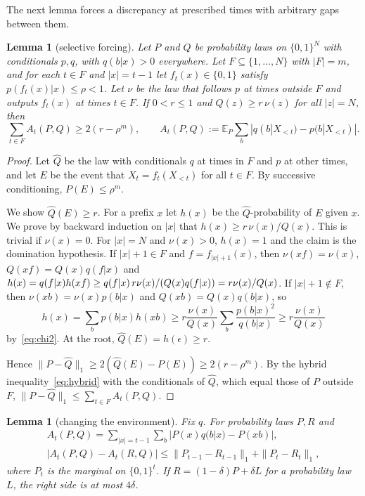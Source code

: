 \documentclass[11pt]{article}
\newcommand{\B}{\{0,1\}}
\newcommand{\eps}{\epsilon}
\newcommand{\E}{\mathbb{E}}
\newtheorem{lemma}[theorem]{Lemma}
\theoremstyle{definition}
\theoremstyle{remark}
\begin{document}
The next lemma forces a discrepancy at prescribed times with arbitrary gaps
between them.

\begin{lemma}[selective forcing]\label{lem:forcing}
Let $P$ and $Q$ be probability laws on $\B^N$ with conditionals $p,q$, with
$q(b|x)>0$ everywhere. Let $F\subseteq\{1,\dots,N\}$ with $|F|=m$, and for
each $t\in F$ and $|x|=t-1$ let $f_t(x)\in\B$ satisfy $p(f_t(x)|x)\le\rho<1$.
Let $\nu$ be the law that follows $p$ at times outside $F$ and outputs $f_t(x)$
at times $t\in F$. If $0<r\le1$ and $Q(z)\ge r\,\nu(z)$ for all $|z|=N$, then
\[
\sum_{t\in F}A_t(P,Q)\ge2(r-\rho^m),\qquad
A_t(P,Q):=\E_P\sum_b|q(b|X_{<t})-p(b|X_{<t})| .
\]
\end{lemma}

\begin{proof}
Let $\widehat Q$ be the law with conditionals $q$ at times in $F$ and $p$ at
other times, and let $E$ be the event that $X_t=f_t(X_{<t})$ for all $t\in F$.
By successive conditioning, $P(E)\le\rho^m$.

We show $\widehat Q(E)\ge r$. For a prefix $x$ let $h(x)$ be the
$\widehat Q$-probability of $E$ given $x$. We prove by backward induction on
$|x|$ that $h(x)\ge r\,\nu(x)/Q(x)$. This is trivial if $\nu(x)=0$. For
$|x|=N$ and $\nu(x)>0$, $h(x)=1$ and the claim is the domination
hypothesis. If $|x|+1\in F$ and $f=f_{|x|+1}(x)$, then $\nu(xf)=\nu(x)$,
$Q(xf)=Q(x)q(f|x)$ and
$h(x)=q(f|x)h(xf)\ge q(f|x)\,r\nu(x)/(Q(x)q(f|x))=\nobreak r\nu(x)/Q(x)$.
If $|x|+1\notin F$, then $\nu(xb)=\nu(x)p(b|x)$ and $Q(xb)=Q(x)q(b|x)$, so
\[
h(x)=\sum_bp(b|x)h(xb)\ge r\frac{\nu(x)}{Q(x)}\sum_b\frac{p(b|x)^2}{q(b|x)}
\ge r\frac{\nu(x)}{Q(x)}
\]
by~\eqref{eq:chi2}. At the root, $\widehat Q(E)=h(\eps)\ge r$.

Hence $\|P-\widehat Q\|_1\ge2(\widehat Q(E)-P(E))\ge2(r-\rho^m)$. By the hybrid
inequality~\eqref{eq:hybrid} with the conditionals of $\widehat Q$, which equal
those of $P$ outside $F$, $\|P-\widehat Q\|_1\le\sum_{t\in F}A_t(P,Q)$.
\end{proof}

\begin{lemma}[changing the environment]\label{lem:envchange}
Fix $q$. For probability laws $P,R$ and
\begin{gather*}
A_t(P,Q)=\sum_{|x|=t-1}\sum_b|P(x)q(b|x)-P(xb)|,\\
|A_t(P,Q)-A_t(R,Q)|\le\|P_{t-1}-R_{t-1}\|_1+\|P_t-R_t\|_1,
\end{gather*}
where $P_t$ is the marginal on $\B^t$. If $R=(1-\delta)P+\delta L$ for a
probability law $L$, the right side is at most $4\delta$.
\end{lemma}
\end{document}
